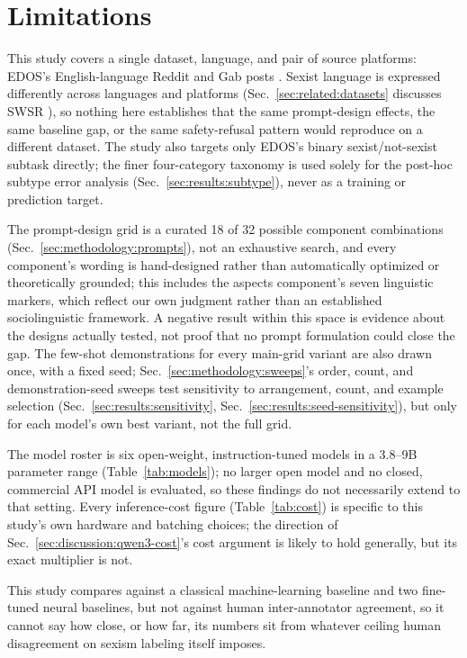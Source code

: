 \section{Limitations}
\label{sec:limitations}

This study covers a single dataset, language, and pair of source
platforms: EDOS's English-language Reddit and Gab posts
\cite{kirk2023semeval}. Sexist language is expressed differently across
languages and platforms (Sec.~\ref{sec:related:datasets} discusses SWSR
\cite{jiang2021swsr}), so nothing here establishes that the same
prompt-design effects, the same baseline gap, or the same safety-refusal
pattern would reproduce on a different dataset. The study also targets
only EDOS's binary sexist/not-sexist subtask directly; the finer
four-category taxonomy is used solely for the post-hoc subtype error
analysis (Sec.~\ref{sec:results:subtype}), never as a training or
prediction target.

The prompt-design grid is a curated 18 of 32 possible component
combinations (Sec.~\ref{sec:methodology:prompts}), not an exhaustive
search, and every component's wording is hand-designed rather than
automatically optimized or theoretically grounded; this includes the
aspects component's seven linguistic markers, which reflect our own
judgment rather than an established sociolinguistic framework. A
negative result within this space is evidence about the designs
actually tested, not proof that no prompt formulation could close the
gap. The few-shot demonstrations for every main-grid variant are also
drawn once, with a fixed seed; Sec.~\ref{sec:methodology:sweeps}'s
order, count, and demonstration-seed sweeps test sensitivity to
arrangement, count, and example selection
(Sec.~\ref{sec:results:sensitivity},
Sec.~\ref{sec:results:seed-sensitivity}), but only for each model's own
best variant, not the full grid.

The model roster is six open-weight, instruction-tuned models in a
3.8--9B parameter range (Table~\ref{tab:models}); no larger open model
and no closed, commercial API model is evaluated, so these findings do
not necessarily extend to that setting. Every inference-cost figure
(Table~\ref{tab:cost}) is specific to this study's own hardware and
batching choices; the direction of Sec.~\ref{sec:discussion:qwen3-cost}'s
cost argument is likely to hold generally, but its exact multiplier is
not.

This study compares against a classical machine-learning baseline and
two fine-tuned neural baselines, but not against human inter-annotator
agreement, so it cannot say how close, or how far, its numbers sit from
whatever ceiling human disagreement on sexism labeling itself imposes.

